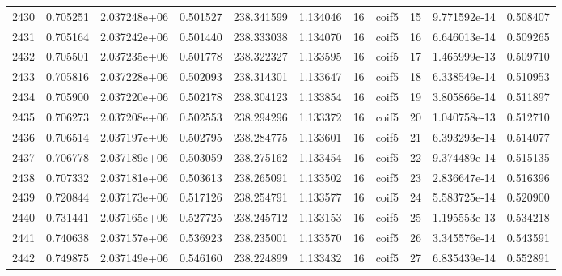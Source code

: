 \begin{tabular}{lrrrrrrlrrr}
2430 &    0.705251 &        2.037248e+06 &  0.501527 &              238.341599 &    1.134046 &      16 &        coif5 &     15 &   9.771592e-14 &      0.508407 \\
2431 &    0.705164 &        2.037242e+06 &  0.501440 &              238.333038 &    1.134070 &      16 &        coif5 &     16 &   6.646013e-14 &      0.509265 \\
2432 &    0.705501 &        2.037235e+06 &  0.501778 &              238.322327 &    1.133595 &      16 &        coif5 &     17 &   1.465999e-13 &      0.509710 \\
2433 &    0.705816 &        2.037228e+06 &  0.502093 &              238.314301 &    1.133647 &      16 &        coif5 &     18 &   6.338549e-14 &      0.510953 \\
2434 &    0.705900 &        2.037220e+06 &  0.502178 &              238.304123 &    1.133854 &      16 &        coif5 &     19 &   3.805866e-14 &      0.511897 \\
2435 &    0.706273 &        2.037208e+06 &  0.502553 &              238.294296 &    1.133372 &      16 &        coif5 &     20 &   1.040758e-13 &      0.512710 \\
2436 &    0.706514 &        2.037197e+06 &  0.502795 &              238.284775 &    1.133601 &      16 &        coif5 &     21 &   6.393293e-14 &      0.514077 \\
2437 &    0.706778 &        2.037189e+06 &  0.503059 &              238.275162 &    1.133454 &      16 &        coif5 &     22 &   9.374489e-14 &      0.515135 \\
2438 &    0.707332 &        2.037181e+06 &  0.503613 &              238.265091 &    1.133502 &      16 &        coif5 &     23 &   2.836647e-14 &      0.516396 \\
2439 &    0.720844 &        2.037173e+06 &  0.517126 &              238.254791 &    1.133577 &      16 &        coif5 &     24 &   5.583725e-14 &      0.520900 \\
2440 &    0.731441 &        2.037165e+06 &  0.527725 &              238.245712 &    1.133153 &      16 &        coif5 &     25 &   1.195553e-13 &      0.534218 \\
2441 &    0.740638 &        2.037157e+06 &  0.536923 &              238.235001 &    1.133570 &      16 &        coif5 &     26 &   3.345576e-14 &      0.543591 \\
2442 &    0.749875 &        2.037149e+06 &  0.546160 &              238.224899 &    1.133432 &      16 &        coif5 &     27 &   6.835439e-14 &      0.552891 \\

\end{tabular}
